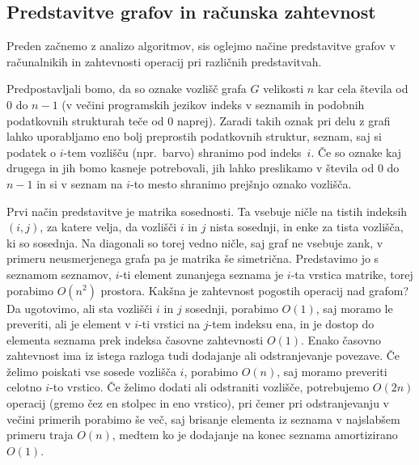 \documentclass[12pt,a4paper,twoside]{article}
\theoremstyle{definition} %
\theoremstyle{plain} %
\numberwithin{equation}{section}  %
\begin{document}
\subsection{Predstavitve grafov in računska zahtevnost}
Preden začnemo z analizo algoritmov, sis oglejmo načine predstavitve grafov v računalnikih in zahtevnosti operacij pri različnih predstavitvah. 

Predpostavljali bomo, da so oznake vozlišč grafa $G$ velikosti $n$ kar cela števila od 0 do $n-1$ (v večini programskih jezikov indeks v seznamih in podobnih podatkovnih strukturah teče od 0 naprej). Zaradi takih oznak pri delu z grafi lahko uporabljamo eno bolj preprostih podatkovnih struktur, seznam, saj si podatek o $i$-tem vozlišču (npr.~barvo) shranimo pod indeks~$i$. Če so oznake kaj drugega in jih bomo kasneje potrebovali, jih lahko preslikamo v števila od 0 do $n-1$ in si v seznam na $i$-to mesto shranimo prejšnjo oznako vozlišča. 

Prvi način predstavitve je matrika sosednosti. Ta vsebuje ničle na tistih indeksih $(i,j)$, za katere velja, da vozlišči $i$ in $j$ nista sosednji, in enke za tista vozlišča, ki so sosednja. Na diagonali so torej vedno ničle, saj graf ne vsebuje zank, v primeru neusmerjenega grafa pa je matrika še simetrična. Predstavimo jo s seznamom seznamov, $i$-ti element zunanjega seznama je $i$-ta vrstica matrike, torej porabimo $O(n^2)$ prostora. Kakšna je zahtevnost pogostih operacij nad grafom? Da ugotovimo, ali sta vozlišči $i$ in $j$ sosednji, porabimo $O(1)$, saj moramo le preveriti, ali je element v $i$-ti vrstici na $j$-tem indeksu ena, in je dostop do elementa seznama prek indeksa časovne zahtevnosti $O(1)$. Enako časovno zahtevnost ima iz istega razloga tudi dodajanje ali odstranjevanje povezave. Če želimo poiskati vse sosede vozlišča $i$, porabimo $O(n)$, saj moramo preveriti celotno $i$-to vrstico. Če želimo dodati ali odstraniti vozlišče, potrebujemo $O(2n)$ operacij (gremo čez en stolpec in eno vrstico), pri čemer pri odstranjevanju v večini primerih porabimo še več, saj brisanje elementa iz seznama v najslabšem primeru traja $O(n)$, medtem ko je dodajanje na konec seznama amortizirano $O(1)$.
\end{document}
